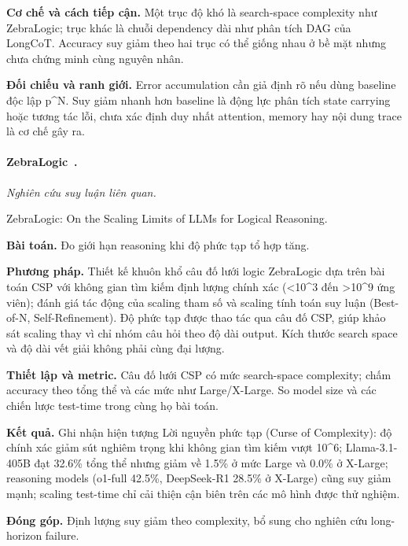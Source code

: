 \noindent\textbf{Cơ chế và cách tiếp cận.} Một trục độ khó là search-space complexity như ZebraLogic; trục khác là chuỗi dependency dài như phân tích DAG của LongCoT. Accuracy suy giảm theo hai trục có thể giống nhau ở bề mặt nhưng chưa chứng minh cùng nguyên nhân.\par
\noindent\textbf{Đối chiếu và ranh giới.} Error accumulation cần giả định rõ nếu dùng baseline độc lập p\textasciicircum{}N. Suy giảm nhanh hơn baseline là động lực phân tích state carrying hoặc tương tác lỗi, chưa xác định duy nhất attention, memory hay nội dung trace là cơ chế gây ra.\par

\begin{samepage}
\paragraph{ZebraLogic~\cite{rra3_zebralogic}.}
\emph{Nghiên cứu suy luận liên quan.}\par
{\raggedright\noindent\small ZebraLogic: On the Scaling Limits of LLMs for Logical Reasoning.\par}
\noindent\textbf{Bài toán.} Đo giới hạn reasoning khi độ phức tạp tổ hợp tăng.\par
\end{samepage}
\noindent\textbf{Phương pháp.} Thiết kế khuôn khổ câu đố lưới logic ZebraLogic dựa trên bài toán CSP với không gian tìm kiếm định lượng chính xác (<10\textasciicircum{}3 đến >10\textasciicircum{}9 ứng viên); đánh giá tác động của scaling tham số và scaling tính toán suy luận (Best-of-N, Self-Refinement). Độ phức tạp được thao tác qua câu đố CSP, giúp khảo sát scaling thay vì chỉ nhóm câu hỏi theo độ dài output. Kích thước search space và độ dài vết giải không phải cùng đại lượng.\par
\noindent\textbf{Thiết lập và metric.} Câu đố lưới CSP có mức search-space complexity; chấm accuracy theo tổng thể và các mức như Large/X-Large. So model size và các chiến lược test-time trong cùng họ bài toán.\par
\noindent\textbf{Kết quả.} Ghi nhận hiện tượng Lời nguyền phức tạp (Curse of Complexity): độ chính xác giảm sút nghiêm trọng khi không gian tìm kiếm vượt 10\textasciicircum{}6; Llama-3.1-405B đạt 32.6\% tổng thể nhưng giảm về 1.5\% ở mức Large và 0.0\% ở X-Large; reasoning models (o1-full 42.5\%, DeepSeek-R1 28.5\% ở X-Large) cũng suy giảm mạnh; scaling test-time chỉ cải thiện cận biên trên các mô hình được thử nghiệm.\par
\noindent\textbf{Đóng góp.} Định lượng suy giảm theo complexity, bổ sung cho nghiên cứu long-horizon failure.\par
